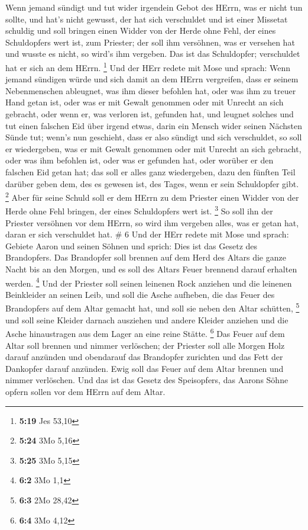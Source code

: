 Wenn jemand sündigt und tut wider irgendein Gebot des
HErrn, was er nicht tun sollte, und hat's nicht gewusst, der hat sich
verschuldet und ist einer Missetat schuldig  und soll
bringen einen Widder von der Herde ohne Fehl, der eines Schuldopfers
wert ist, zum Priester; der soll ihm versöhnen, was er versehen hat und
wusste es nicht, so wird's ihm vergeben.  Das ist das
Schuldopfer; verschuldet hat er sich an dem HErrn. \footnote{\textbf{5:19}
  Jes 53,10}  Und der HErr redete mit Mose und sprach:
 Wenn jemand sündigen würde und sich damit an dem HErrn
vergreifen, dass er seinem Nebenmenschen ableugnet, was ihm dieser
befohlen hat, oder was ihm zu treuer Hand getan ist, oder was er mit
Gewalt genommen oder mit Unrecht an sich gebracht,  oder
wenn er, was verloren ist, gefunden hat, und leugnet solches und tut
einen falschen Eid über irgend etwas, darin ein Mensch wider seinen
Nächsten Sünde tut;  wenn's nun geschieht, dass er also
sündigt und sich verschuldet, so soll er wiedergeben, was er mit Gewalt
genommen oder mit Unrecht an sich gebracht, oder was ihm befohlen ist,
oder was er gefunden hat,  oder worüber er den falschen Eid
getan hat; das soll er alles ganz wiedergeben, dazu den fünften Teil
darüber geben dem, des es gewesen ist, des Tages, wenn er sein
Schuldopfer gibt. \footnote{\textbf{5:24} 3Mo 5,16}  Aber
für seine Schuld soll er dem HErrn zu dem Priester einen Widder von der
Herde ohne Fehl bringen, der eines Schuldopfers wert ist. \footnote{\textbf{5:25}
  3Mo 5,15}  So soll ihn der Priester versöhnen vor dem
HErrn, so wird ihm vergeben alles, was er getan hat, daran er sich
verschuldet hat. \# 6  Und der HErr redete mit Mose und
sprach:  Gebiete Aaron und seinen Söhnen und sprich: Dies
ist das Gesetz des Brandopfers. Das Brandopfer soll brennen auf dem Herd
des Altars die ganze Nacht bis an den Morgen, und es soll des Altars
Feuer brennend darauf erhalten werden. \footnote{\textbf{6:2} 3Mo 1,1}
 Und der Priester soll seinen leinenen Rock anziehen und die
leinenen Beinkleider an seinen Leib, und soll die Asche aufheben, die
das Feuer des Brandopfers auf dem Altar gemacht hat, und soll sie neben
den Altar schütten, \footnote{\textbf{6:3} 2Mo 28,42}  und
soll seine Kleider darnach ausziehen und andere Kleider anziehen und die
Asche hinaustragen aus dem Lager an eine reine Stätte. \footnote{\textbf{6:4}
  3Mo 4,12}  Das Feuer auf dem Altar soll brennen und nimmer
verlöschen; der Priester soll alle Morgen Holz darauf anzünden und
obendarauf das Brandopfer zurichten und das Fett der Dankopfer darauf
anzünden.  Ewig soll das Feuer auf dem Altar brennen und
nimmer verlöschen.  Und das ist das Gesetz des Speisopfers,
das Aarons Söhne opfern sollen vor dem HErrn auf dem Altar.

